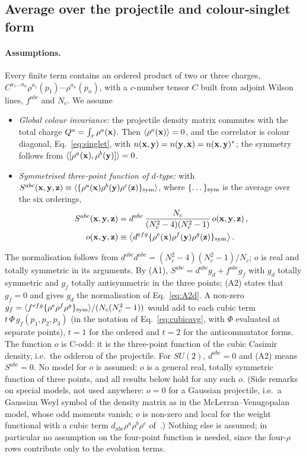 \subsection{Average over the projectile and colour-singlet form}\label{sec:fin_singlet}

\paragraph{Assumptions.} Every finite term contains an ordered product of two or three charges, $C^{a_1\dots a_n}\rho^{a_1}(p_1)\cdots\rho^{a_n}(p_n)$, with a $c$-number tensor $C$ built from adjoint Wilson lines, $f^{abc}$ and $N_c$. We assume
\begin{itemize}
\item[(A1)] \emph{Global colour invariance:} the projectile density matrix commutes with the total charge $Q^a=\int_x\rho^a(\mathbf{x})$. Then $\langle\rho^a(\mathbf{x})\rangle=0$, and the correlator is colour diagonal, Eq.~\eqref{eq:singlet}, with $n(\mathbf{x},\mathbf{y})=n(\mathbf{y},\mathbf{x})=n(\mathbf{x},\mathbf{y})^*$; the symmetry follows from $\langle[\rho^a(\mathbf{x}),\rho^b(\mathbf{y})]\rangle=0$.
\item[(A2)] \emph{Symmetrised three-point function of $d$-type:} with $S^{abc}(\mathbf{x},\mathbf{y},\mathbf{z})\equiv\langle\{\rho^a(\mathbf{x})\rho^b(\mathbf{y})\rho^c(\mathbf{z})\}_{\rm sym}\rangle$, where $\{\dots\}_{\rm sym}$ is the average over the six orderings,
\begin{align}\label{eq:A2d}
S^{abc}(\mathbf{x},\mathbf{y},\mathbf{z})&=d^{abc}\,\frac{N_c}{(N_c^2-4)(N_c^2-1)}\,o(\mathbf{x},\mathbf{y},\mathbf{z})\,,\notag\\
o(\mathbf{x},\mathbf{y},\mathbf{z})&\equiv\big\langle d^{efg}\{\rho^e(\mathbf{x})\rho^f(\mathbf{y})\rho^g(\mathbf{z})\}_{\rm sym}\big\rangle\,.
\end{align}
\end{itemize}
The normalisation follows from $d^{abc}d^{abc}=(N_c^2-4)(N_c^2-1)/N_c$; $o$ is real and totally symmetric in its arguments. By (A1), $S^{abc}=d^{abc}g_d+f^{abc}g_f$ with $g_d$ totally symmetric and $g_f$ totally antisymmetric in the three points; (A2) states that $g_f=0$ and gives $g_d$ the normalisation of Eq.~\eqref{eq:A2d}. A non-zero $g_f=\langle f^{efg}\{\rho^e\rho^f\rho^g\}_{\rm sym}\rangle/(N_c(N_c^2-1))$ would add to each cubic term $t\,\Phi\,g_f(p_1,p_2,p_3)$ (in the notation of Eq.~\eqref{eq:cubicavg}, with $\Phi$ evaluated at separate points), $t=1$ for the ordered and $t=2$ for the anticommutator forms. The function $o$ is C-odd: it is the three-point function of the cubic Casimir density, i.e.\ the odderon of the projectile. For $SU(2)$, $d^{abc}=0$ and (A2) means $S^{abc}=0$. No model for $o$ is assumed: $o$ is a general real, totally symmetric function of three points, and all results below hold for any such $o$. (Side remarks on special models, not used anywhere: $o=0$ for a Gaussian projectile, i.e.\ a Gaussian Weyl symbol of the density matrix as in the McLerran--Venugopalan model, whose odd moments vanish; $o$ is non-zero and local for the weight functional with a cubic term $d_{abc}\rho^a\rho^b\rho^c$ of~\cite{Jeon:2005cf}.) Nothing else is assumed; in particular no assumption on the four-point function is needed, since the four-$\rho$ rows contribute only to the evolution terms.

